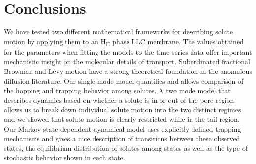 \documentclass[aps,pre,preprint,groupedaddress,longbibliography]{revtex4-2}
\begin{document}

  \section{Conclusions}
  
  We have tested two different mathematical frameworks for describing solute
  motion by applying them to an H\textsubscript{II} phase LLC membrane. The values
  obtained for the parameters when fitting the models to the time series data 
  offer important mechanistic insight on the molecular details of transport.
  Subordinated fractional Brownian and L\'evy motion have a strong theoretical 
  foundation in the anomalous diffusion literature. Our single mode model
  quantifies and allows comparison of the hopping and trapping behavior 
  among solutes. A two mode model that describes dynamics based on whether
  a solute is in or out of the pore region allows us to break down individual
  solute motion into the two distinct regimes and we showed that solute motion is
  clearly restricted while in the tail region. Our Markov state-dependent dynamical
  model uses explicitly defined trapping mechanisms and gives a nice description 
  of transitions between these observed states, the equilibrium distribution of 
  solutes among states as well as the type of stochastic behavior shown in each 
  state. 
  
\end{document}
